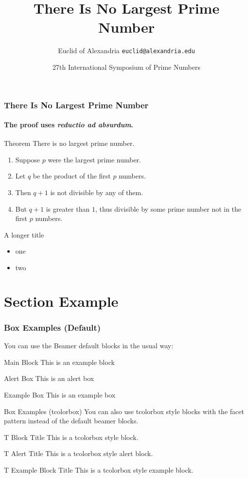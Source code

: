 \documentclass[aspectratio=1610]{beamer}
\title{There Is No Largest Prime Number}
\date[ISPN ’80]{27th International Symposium of Prime Numbers}
\author[Euclid]{Euclid of Alexandria \texttt{euclid@alexandria.edu}}
\begin{document}
\begin{frame}
\titlepage
\end{frame}


\begin{frame} 
\frametitle{There Is No Largest Prime Number} 
\framesubtitle{The proof uses \textit{reductio ad absurdum}.} 
\begin{tblock}{Theorem}
There is no largest prime number. \end{tblock} 
\begin{enumerate} 
\item<1-| alert@1> Suppose $p$ were the largest prime number. 
\item<2-> Let $q$ be the product of the first $p$ numbers. 
\item<3-> Then $q+1$ is not divisible by any of them. 
\item<4-> But $q + 1$ is greater than $1$, thus divisible by some prime
number not in the first $p$ numbers.
\end{enumerate}
\end{frame}

\begin{frame}{A longer title}
\begin{itemize}
\item one
\item two
\end{itemize}
\end{frame}

\section{Section Example}

\begin{frame}
\frametitle{Box Examples (Default)}
You can use the Beamer default blocks in the usual way:
\begin{block}{Main Block}
This is an example block
\end{block}
\begin{alertblock}{Alert Box}
This is an alert box
\end{alertblock}
\begin{exampleblock}{Example Box}
    This is an example box
\end{exampleblock}
\end{frame}

\begin{frame}{Box Examples (tcolorbox)}
    You can also use tcolorbox style blocks with the facet pattern instead of the default beamer blocks.
    \begin{tblock}{T Block Title}
        This is a tcolorbox style block.
    \end{tblock}
    \begin{talert}{T Alert Title}
        This is a tcolorbox style alert block.
    \end{talert}
    \begin{texample}{T Example Block Title}
        This is a tcolorbox style example block.
    \end{texample}
\end{frame}
\end{document}
